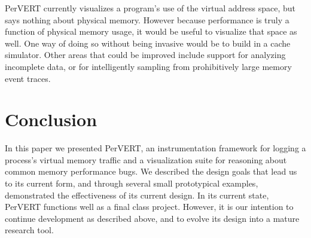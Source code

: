 \documentclass[annual]{acmsiggraph}
\begin{document}
  PerVERT currently visualizes a program's use of the virtual address space, but says nothing about physical memory.
  However because performance is truly a function of physical memory usage, it would be useful to visualize that space as well.
  One way of doing so without being invasive would be to build in a cache simulator.
  Other areas that could be improved include support for analyzing incomplete data, 
    or for intelligently sampling from prohibitively large memory event traces.

\section{Conclusion}

In this paper we presented PerVERT, an instrumentation framework for logging a process's virtual memory traffic and 
  a visualization suite for reasoning about common memory performance bugs.
We described the design goals that lead us to its current form,
  and through several small prototypical examples, demonstrated the effectiveness of its current design.
In its current state, PerVERT functions well as a final class project.
However, it is our intention to continue development as described above, and to evolve its design into a mature research tool.



\end{document}
